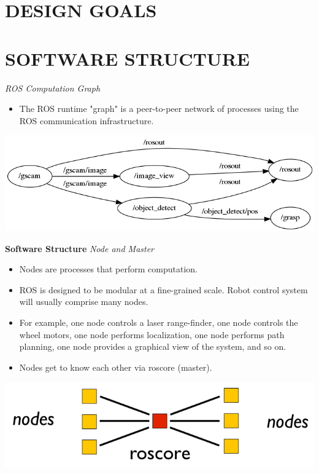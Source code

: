 \documentclass[a4paper, 10pt, conference]{ieeeconf}       %
\begin{document}
\section{DESIGN GOALS}




\section{SOFTWARE STRUCTURE}

\textit{ROS Computation Graph}

\begin{itemize}
  \item The ROS runtime "graph" is a peer-to-peer network of processes using the ROS communication infrastructure.
\end{itemize}
\begin{center}
  \includegraphics[width=\textwidth]{comp_graph}
\end{center}




\textbf{Software Structure}
\textit{Node and Master}

\begin{itemize}
  \item Nodes are processes that perform computation. 
  \item ROS is designed to be modular at a fine-grained scale. Robot control system will usually comprise many nodes.
  \item For example, one node controls a laser range-finder, one node controls the wheel motors, one node performs localization, one node performs path planning, one node provides a graphical view of the system, and so on.
  \item Nodes get to know each other via roscore (master).
\end{itemize}

\begin{center}
  \includegraphics[width=.6\textwidth]{nodes}
\end{center}
\end{document}
